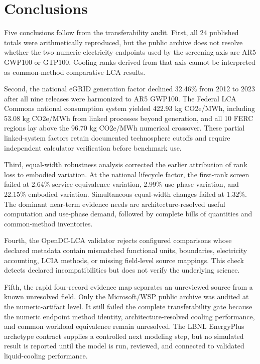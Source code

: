 \documentclass[review,12pt]{elsarticle}
\begin{document}
\section{Conclusions}
Five conclusions follow from the transferability audit. First, all 24 published totals were arithmetically reproduced, but the public archive does not resolve whether the two numeric electricity endpoints used by the screening axis are AR5 GWP100 or GTP100. Cooling ranks derived from that axis cannot be interpreted as common-method comparative LCA results.

Second, the national eGRID generation factor declined 32.46\% from 2012 to 2023 after all nine releases were harmonized to AR5 GWP100. The Federal LCA Commons national consumption system yielded 422.93 kg CO2e/MWh, including 53.08 kg CO2e/MWh from linked processes beyond generation, and all 10 FERC regions lay above the 96.70 kg CO2e/MWh numerical crossover. These partial linked-system factors retain documented technosphere cutoffs and require independent calculator verification before benchmark use.

Third, equal-width robustness analysis corrected the earlier attribution of rank loss to embodied variation. At the national lifecycle factor, the first-rank screen failed at 2.64\% service-equivalence variation, 2.99\% use-phase variation, and 22.15\% embodied variation. Simultaneous equal-width changes failed at 1.32\%. The dominant near-term evidence needs are architecture-resolved useful computation and use-phase demand, followed by complete bills of quantities and common-method inventories.

Fourth, the OpenDC-LCA validator rejects configured comparisons whose declared metadata contain mismatched functional units, boundaries, electricity accounting, LCIA methods, or missing field-level source mappings. This check detects declared incompatibilities but does not verify the underlying science.

Fifth, the rapid four-record evidence map separates an unreviewed source from a known unresolved field. Only the Microsoft/WSP public archive was audited at the numeric-artifact level. It still failed the complete transferability gate because the numeric endpoint method identity, architecture-resolved cooling performance, and common workload equivalence remain unresolved. The LBNL EnergyPlus archetype contract supplies a controlled next modeling step, but no simulated result is reported until the model is run, reviewed, and connected to validated liquid-cooling performance.
\end{document}
